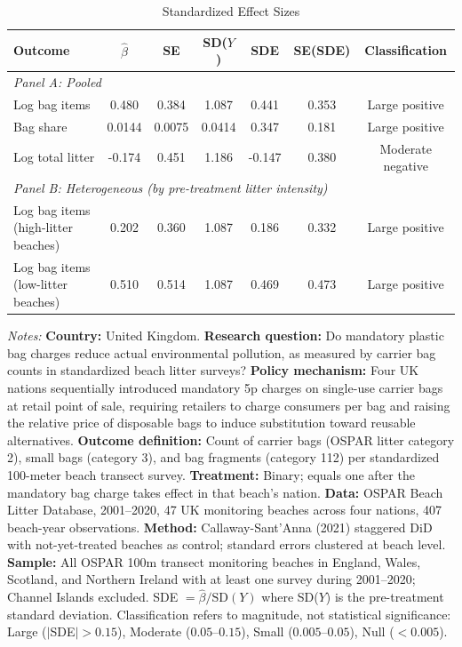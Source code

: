 \begin{table}[htbp]
\centering
\begin{threeparttable}
\caption{Standardized Effect Sizes}
\label{tab:sde}
\footnotesize
\begin{tabular}{lcccccc}
\toprule
Outcome & $\hat{\beta}$ & SE & SD($Y$) & SDE & SE(SDE) & Classification \\
\midrule
\multicolumn{7}{l}{\textit{Panel A: Pooled}} \\[3pt]
Log bag items & 0.480 & 0.384 & 1.087 & 0.441 & 0.353 & Large positive \\
Bag share & 0.0144 & 0.0075 & 0.0414 & 0.347 & 0.181 & Large positive \\
Log total litter & -0.174 & 0.451 & 1.186 & -0.147 & 0.380 & Moderate negative \\
\midrule
\multicolumn{7}{l}{\textit{Panel B: Heterogeneous (by pre-treatment litter intensity)}} \\[3pt]
Log bag items (high-litter beaches) & 0.202 & 0.360 & 1.087 & 0.186 & 0.332 & Large positive \\
Log bag items (low-litter beaches) & 0.510 & 0.514 & 1.087 & 0.469 & 0.473 & Large positive \\
\bottomrule
\end{tabular}
\begin{tablenotes}[flushleft]
\scriptsize
\item \textit{Notes:} \textbf{Country:} United Kingdom. \textbf{Research question:} Do mandatory plastic bag charges reduce actual environmental pollution, as measured by carrier bag counts in standardized beach litter surveys? \textbf{Policy mechanism:} Four UK nations sequentially introduced mandatory 5p charges on single-use carrier bags at retail point of sale, requiring retailers to charge consumers per bag and raising the relative price of disposable bags to induce substitution toward reusable alternatives. \textbf{Outcome definition:} Count of carrier bags (OSPAR litter category 2), small bags (category 3), and bag fragments (category 112) per standardized 100-meter beach transect survey. \textbf{Treatment:} Binary; equals one after the mandatory bag charge takes effect in that beach's nation. \textbf{Data:} OSPAR Beach Litter Database, 2001--2020, 47 UK monitoring beaches across four nations, 407 beach-year observations. \textbf{Method:} Callaway-Sant'Anna (2021) staggered DiD with not-yet-treated beaches as control; standard errors clustered at beach level. \textbf{Sample:} All OSPAR 100m transect monitoring beaches in England, Wales, Scotland, and Northern Ireland with at least one survey during 2001--2020; Channel Islands excluded. SDE $= \hat{\beta} / \text{SD}(Y)$ where SD($Y$) is the pre-treatment standard deviation. Classification refers to magnitude, not statistical significance: Large ($|$SDE$| > 0.15$), Moderate ($0.05$--$0.15$), Small ($0.005$--$0.05$), Null ($< 0.005$).
\end{tablenotes}
\end{threeparttable}
\end{table}
